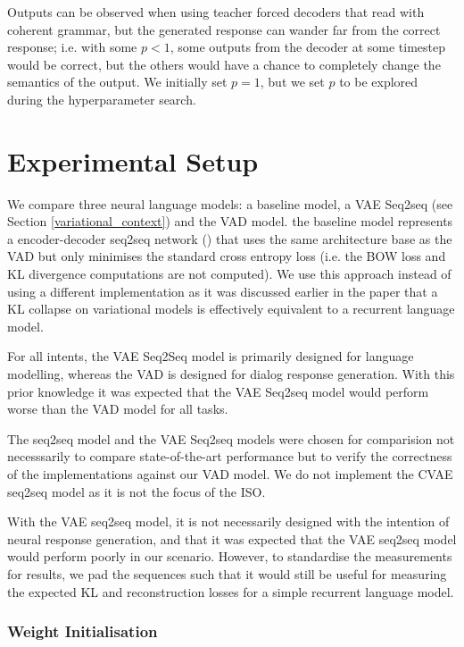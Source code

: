 \documentclass[12pt,twoside]{report}
\begin{document}
Outputs can be observed when using teacher forced decoders that read with coherent grammar, but the generated response can wander far from the correct response; i.e. with some $p<1$, some outputs from the decoder at some timestep would be correct, but the others would have a chance to completely change the semantics of the output. We initially set $p=1$, but we set $p$ to be explored during the hyperparameter search.

\chapter{Experimental Setup}

We compare three neural language models: a baseline model, a VAE Seq2seq (see Section \ref{variational_context}) and the VAD model. the baseline model represents a encoder-decoder seq2seq network (\cite{serban_hierarchical_2016}) that uses the same architecture base as the VAD but only minimises the standard cross entropy loss (i.e. the BOW loss and KL divergence computations are not computed). We use this approach instead of using a different implementation as it was discussed earlier in the paper that a KL collapse on variational models is effectively equivalent to a recurrent language model.

For all intents, the VAE Seq2Seq model is primarily designed for language modelling, whereas the VAD is designed for dialog response generation. With this prior knowledge it was expected that the VAE Seq2seq model would perform worse than the VAD model for all tasks.

The seq2seq model and the VAE Seq2seq models were chosen for comparision not necesssarily to compare state-of-the-art performance but to verify the correctness of the implementations against our VAD model. We do not implement the CVAE seq2seq model as it is not the focus of the ISO.

With the VAE seq2seq model, it is not necessarily designed with the intention of neural response generation, and that it was expected that the VAE seq2seq model would perform poorly in our scenario. However, to standardise the measurements for results, we pad the sequences such that it would still be useful for measuring the expected KL and reconstruction losses for a simple recurrent language model.

\subsection*{Weight Initialisation}
\end{document}
